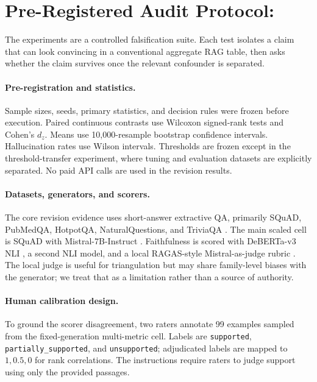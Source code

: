 \section{Pre-Registered Audit Protocol: \method{}}
\label{sec:protocol}

The experiments are a controlled falsification suite. Each test isolates a
claim that can look convincing in a conventional aggregate RAG table, then
asks whether the claim survives once the relevant confounder is separated.

\paragraph{Pre-registration and statistics.}
Sample sizes, seeds, primary statistics, and decision rules were frozen before
execution. Paired continuous contrasts use Wilcoxon signed-rank tests and
Cohen's \(d_z\). Means use 10,000-resample bootstrap confidence intervals.
Hallucination rates use Wilson intervals. Thresholds are frozen except in the
threshold-transfer experiment, where tuning and evaluation datasets are
explicitly separated. No paid API calls are used in the revision results.

\paragraph{Datasets, generators, and scorers.}
The core revision evidence uses short-answer extractive QA, primarily SQuAD,
PubMedQA, HotpotQA, NaturalQuestions, and TriviaQA
\citep{rajpurkar2016squad,jin2019pubmedqa,yang2018hotpotqa,kwiatkowski2019nq,joshi2017triviaqa}.
The main scaled cell is SQuAD with Mistral-7B-Instruct
\citep{jiang2023mistral}. Faithfulness is scored with DeBERTa-v3 NLI
\citep{he2021deberta}, a second NLI model, and a local RAGAS-style
Mistral-as-judge rubric \citep{es2024ragas}. The local judge is useful for
triangulation but may share family-level biases with the generator; we treat
that as a limitation rather than a source of authority.

\paragraph{Human calibration design.}
To ground the scorer disagreement, two raters annotate 99 examples sampled
from the fixed-generation multi-metric cell. Labels are
\texttt{supported}, \texttt{partially\_supported}, and \texttt{unsupported};
adjudicated labels are mapped to \(1,0.5,0\) for rank correlations. The
instructions require raters to judge support using only the provided passages.

